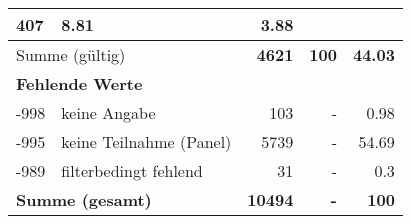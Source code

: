 \begin{longtable}{lXrrr}
       \num{407} &
       \num[round-mode=places,round-precision=2]{8.81} &
         \num[round-mode=places,round-precision=2]{3.88} \\
     \midrule
     \multicolumn{2}{l}{Summe (gültig)} &
       \textbf{\num{4621}} &
     \textbf{\num{100}} &
       \textbf{\num[round-mode=places,round-precision=2]{44.03}} \\
     \multicolumn{5}{l}{\textbf{Fehlende Werte}}\\
       -998 &
       keine Angabe &
         \num{103} &
        - &
         \num[round-mode=places,round-precision=2]{0.98} \\
       -995 &
       keine Teilnahme (Panel) &
         \num{5739} &
        - &
         \num[round-mode=places,round-precision=2]{54.69} \\
       -989 &
       filterbedingt fehlend &
         \num{31} &
        - &
         \num[round-mode=places,round-precision=2]{0.3} \\
     \midrule
     \multicolumn{2}{l}{\textbf{Summe (gesamt)}} &
          \textbf{\num{10494}} &
        \textbf{-} &
        \textbf{\num{100}} \\
     \bottomrule
     \end{longtable}
     
